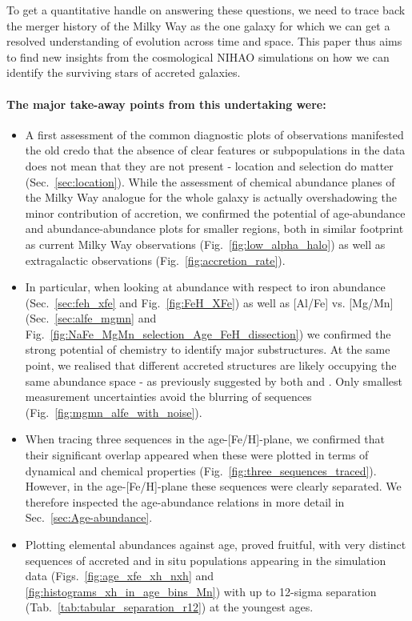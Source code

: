 \documentclass[fleqn,usenatbib]{mnras}
\begin{document}
To get a quantitative handle on answering these questions, we need to trace back the merger history of the Milky Way as the one galaxy for which we can get a resolved understanding of evolution across time and space. This paper thus aims to find new insights from the cosmological \textsc{NIHAO} simulations on how we can identify the surviving stars of accreted galaxies.

\paragraph*{The major take-away points from this undertaking were:}
\begin{itemize}
    \item A first assessment of the common diagnostic plots of observations manifested the old credo that the absence of clear features or subpopulations in the data does not mean that they are not present - location and selection do matter (Sec.~\ref{sec:location}). While the assessment of chemical abundance planes of the Milky Way analogue for the whole galaxy is actually overshadowing the minor contribution of accretion, we confirmed the potential of age-abundance and abundance-abundance plots for smaller regions, both in similar footprint as current Milky Way observations (Fig.~\ref{fig:low_alpha_halo}) as well as extragalactic observations (Fig.~\ref{fig:accretion_rate}).
    \item In particular, when looking at abundance with respect to iron abundance (Sec.~\ref{sec:feh_xfe} and Fig.~\ref{fig:FeH_XFe}) as well as [Al/Fe] vs. [Mg/Mn] (Sec.~\ref{sec:alfe_mgmn} and Fig.~\ref{fig:NaFe_MgMn_selection_Age_FeH_dissection}) we confirmed the strong potential of chemistry to identify major substructures. At the same point, we realised that different accreted structures are likely occupying the same abundance space - as previously suggested by both \citet{Horta2021} and \citet{Rey2023}. Only smallest measurement uncertainties avoid the blurring of sequences (Fig.~\ref{fig:mgmn_alfe_with_noise}).
    \item When tracing three sequences in the age-[Fe/H]-plane, we confirmed that their significant overlap appeared when these were plotted in terms of dynamical and chemical properties (Fig.~\ref{fig:three_sequences_traced}). However, in the age-[Fe/H]-plane these sequences were clearly separated. We therefore inspected the age-abundance relations in more detail in Sec.~\ref{sec:Age-abundance}. 
    \item Plotting elemental abundances against age, proved fruitful, with very distinct sequences of accreted and in situ populations appearing in the simulation data (Figs.~\ref{fig:age_xfe_xh_nxh} and \ref{fig:histograms_xh_in_age_bins_Mn}) with up to 12-sigma separation (Tab.~\ref{tab:tabular_separation_r12}) at the youngest ages.

\end{itemize}
\end{document}
